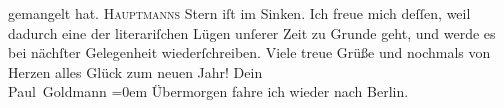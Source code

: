 \begin{ledgroupsized}[t]{13cm}
               gemangelt hat. \textsc{Hauptmanns} Stern iſt im Sinken. Ich
               freue mich deſſen, weil dadurch eine der literariſchen Lügen unſerer Zeit zu Grunde
               geht, und werde es bei nächſter Gelegenheit wiederſchreiben.\pend
           \pstart
           Viele treue Grüße und nochmals von Herzen alles Glück zum neuen Jahr! Dein
                  {\\[\baselineskip]}\spacefill\mbox{Paul Goldmann}\pend
           \leftskip=0em{}\pstart
           \noindent{}Übermorgen fahre ich wieder nach Berlin.\pend
           
         
         \endnumbering{}\end{ledgroupsized}  \newcommand{\dateiname}{L02947}\newcommand{\titel}{Paul Goldmann an Arthur Schnitzler, 31. 12. [1900]}\newcommand{\editorInnen}{Martin Anton Müller und Laura Untner}
      